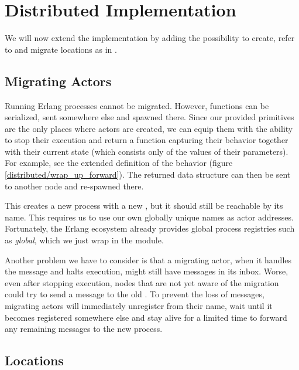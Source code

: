 \section{Distributed Implementation}

We will now extend the implementation by adding the possibility to
create, refer to and migrate locations as in \distjoincalc.


\subsection{Migrating Actors}
\label{ch_migration}

Running Erlang processes cannot be migrated.
However, functions can be serialized, sent somewhere else and spawned there.
Since our provided primitives are the only places where actors are created,
we can equip them with the ability to stop their execution
and return a function capturing their behavior together with their
current state (which consists only of the values of their parameters).
For example, see the extended definition of the  behavior
(figure \ref{distributed/wrap_up_forward}).
The returned data structure can then be sent to another node
and re-spawned there.


This creates a new process with a new \PID,
but it should still be reachable by its name.
This requires us to use our own globally unique names as actor addresses.
Fortunately, the Erlang ecosystem already provides global process registries
such as \emph{global}, which we just wrap in the  module.

Another problem we have to consider is that a migrating actor,
when it handles the  message and halts execution,
might still have messages in its inbox.
Worse, even after stopping execution,
nodes that are not yet aware of the migration
could try to send a message to the old \PID.
To prevent the loss of messages, migrating actors will immediately unregister
from their name, wait until it becomes registered somewhere else
and stay alive for a limited time to forward any remaining messages
to the new process.


\subsection{Locations}

